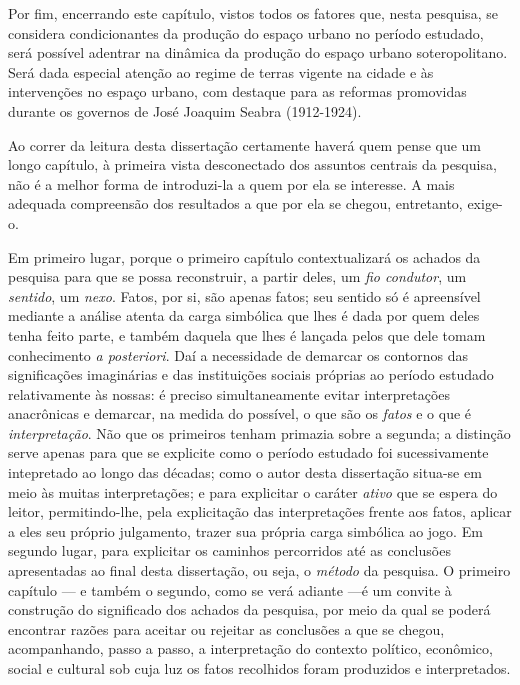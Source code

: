 Por fim, encerrando este capítulo, vistos todos os fatores que, nesta pesquisa, se considera condicionantes da produção do espaço urbano no período estudado, será possível adentrar na dinâmica da produção do espaço urbano soteropolitano. Será dada especial atenção ao regime de terras vigente na cidade e às intervenções no espaço urbano, com destaque para as reformas promovidas durante os governos de José Joaquim Seabra (1912-1924). 

Ao correr da leitura desta dissertação certamente haverá quem pense que um longo capítulo, à primeira vista desconectado dos assuntos centrais da pesquisa, não é a melhor forma de introduzi-la a quem por ela se interesse. A mais adequada compreensão dos resultados a que por ela se chegou, entretanto, exige-o.

Em primeiro lugar, porque o primeiro capítulo contextualizará os achados da pesquisa para que se possa reconstruir, a partir deles, um \textit{fio condutor}, um \textit{sentido}, um \textit{nexo}. Fatos, por si, são apenas fatos; seu sentido só é apreensível mediante a análise atenta da carga simbólica que lhes é dada por quem deles tenha feito parte, e também daquela que lhes é lançada pelos que dele tomam conhecimento \textit{a posteriori}. Daí a necessidade de demarcar os contornos das significações imaginárias e das instituições sociais próprias ao período estudado relativamente às nossas: é preciso simultaneamente evitar interpretações anacrônicas e demarcar, na medida do possível, o que são os \textit{fatos} e o que é \textit{interpretação}. Não que os primeiros tenham primazia sobre a segunda; a distinção serve apenas para que se explicite como o período estudado foi sucessivamente intepretado ao longo das décadas; como o autor desta dissertação situa-se em meio às muitas interpretações; e para explicitar o caráter \textit{ativo} que se espera do leitor, permitindo-lhe, pela explicitação das interpretações frente aos fatos, aplicar a eles seu próprio julgamento, trazer sua própria carga simbólica ao jogo. Em segundo lugar, para explicitar os caminhos percorridos até as conclusões apresentadas ao final desta dissertação, ou seja, o \textit{método} da pesquisa. O primeiro capítulo --- e também o segundo, como se verá adiante ---é um convite à construção do significado dos achados da pesquisa, por meio da qual se poderá encontrar razões para aceitar ou rejeitar as conclusões a que se chegou, acompanhando, passo a passo, a interpretação do contexto político, econômico, social e cultural sob cuja luz os fatos recolhidos foram produzidos e interpretados.

